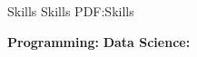\documentclass[letterpaper,MMMyyyy,nonstopmode]{simpleresumecv}
\begin{document}
\begin{Body}










\Section
{Skills}
{Skills}
{PDF:Skills}
\Entry
\Gap

{\bf Programming:} \hspace{5.9cm} {\bf Data Science:}




\end{Body}
\end{document}
